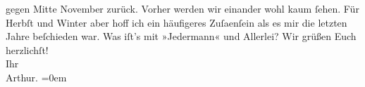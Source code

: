 \begin{ledgroupsized}[t]{13cm}
               gegen {\pb}Mitte November zurück. Vorher werden wir einander wohl kaum ſehen. Für
                  Herbſt und Winter aber hoff ich ein häufigeres Zuſa{\geminationm}enſein als es mir die letzten Jahre beſchieden war. Was
               iſt’s mit »Jedermann« und Allerlei? \pend
           \pstart
           Wir grüßen Euch herzlichſt!{\\[\baselineskip]}Ihr{\\[\baselineskip]}\spacefill\mbox{Arthur.}\pend
           \leftskip=0em{}
         
         \endnumbering{}\end{ledgroupsized}  \newcommand{\dateiname}{L02041}\newcommand{\titel}{Arthur Schnitzler an Hugo von Hofmannsthal, 22. 10. 1911}\newcommand{\editorInnen}{Martin Anton Müller und Gerd-Hermann Susen}
      